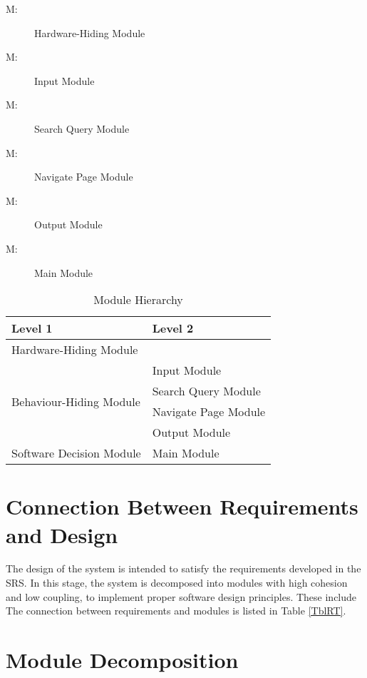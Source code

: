 \documentclass[12pt, titlepage]{article}
\newcounter{mnum}
\newcommand{\mthemnum}{M\themnum}
\begin{document}
\begin{description}
\item [ \mthemnum \label{mHH}:] Hardware-Hiding Module
\item [ \mthemnum \label{mInput}:] Input Module
\item [ \mthemnum \label{mSQ}:] Search Query Module
\item [ \mthemnum \label{mNP}:] Navigate Page Module
\item [ \mthemnum \label{mOutput}:] Output Module
\item [ \mthemnum \label{mMain}:] Main Module
\end{description}


\begin{table}[h!]
\centering
\begin{tabular}{p{} p{}}
\toprule
\textbf{Level 1} & \textbf{Level 2}\\
\midrule

{Hardware-Hiding Module} & ~ \\
\midrule

\multirow{4}{0.3\textwidth}{Behaviour-Hiding Module} 
& Input Module\\
& Search Query Module\\
& Navigate Page Module\\
& Output Module\\
\midrule

\multirow{1}{0.3\textwidth}{Software Decision Module} 
& Main Module\\
\bottomrule

\end{tabular}
\caption{Module Hierarchy}
\label{TblMH}
\end{table}

\section{Connection Between Requirements and Design} \label{SecConnection}

The design of the system is intended to satisfy the requirements developed in the SRS. In this stage, the system is decomposed into modules with high cohesion and low coupling, to implement proper software design principles. These include  The connection between requirements and modules is listed in Table \ref{TblRT}.

\section{Module Decomposition} \label{SecMD}
\end{document}
